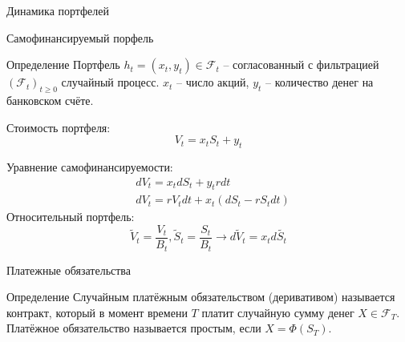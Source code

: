 \documentclass{beamer}
\begin{document}
\begin{frame}
  \centering
\Large Динамика портфелей
\end{frame}

\begin{frame}{Самофинансируемый порфель}
     {\begin{block}{Определение}
        Портфель $h_t = (x_t, y_t) \in \mathcal{F}_t$ -- согласованный с фильтрацией $(\mathcal{F}_t)_{t\geq 0}$ случайный процесс. $x_t$ -- число акций, $y_t$ -- количество денег на банковском счёте.
    \end{block}}

    {Стоимость портфеля:
    $$
        V_t = x_t S_t + y_t
    $$}

    {Уравнение самофинансируемости:
    \begin{align*}
        &dV_t = x_t dS_t + y_t r dt \\
        &dV_t =
        r V_t dt + x_t (dS_t - r S_t dt)
    \end{align*}}
    {Относительный портфель:
    $$
        \widetilde{V}_t = \dfrac{V_t}{B_t}, \widetilde{S}_t = \dfrac{S_t}{B_t} \to 
        d \widetilde{V}_t = x_t d\widetilde{S_t}
    $$}
\end{frame}

\begin{frame}{Платежные обязательства}
    \begin{block}{Определение}
        Случайным платёжным обязательством (деривативом) называется контракт, который в момент времени $T$ платит случайную сумму денег $X \in \mathcal{F}_T$. Платёжное обязательство называется простым, если $X = \Phi(S_T)$.
    \end{block}

\end{frame}
\end{document}
